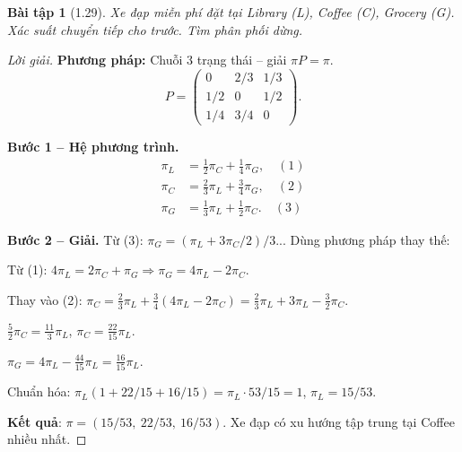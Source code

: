 \documentclass[8pt,a4paper]{article}
\newtheorem{exercise}{Bài tập}
\newenvironment{solution}{\begin{proof}[Lời giải]}{\end{proof}}
\begin{document}
\begin{exercise}[1.29]
Xe đạp miễn phí đặt tại Library (L), Coffee (C), Grocery (G). Xác suất chuyển tiếp cho trước. Tìm phân phối dừng.
\end{exercise}
\begin{solution}
\textbf{Phương pháp:} Chuỗi 3 trạng thái -- giải $\pi P = \pi$.
\[
  P = \begin{pmatrix} 0 & 2/3 & 1/3 \\ 1/2 & 0 & 1/2 \\ 1/4 & 3/4 & 0 \end{pmatrix}.
\]

\textbf{Bước 1 -- Hệ phương trình.}
\begin{align*}
  \pi_L &= \tfrac{1}{2}\pi_C + \tfrac{1}{4}\pi_G, \quad (1) \\
  \pi_C &= \tfrac{2}{3}\pi_L + \tfrac{3}{4}\pi_G, \quad (2) \\
  \pi_G &= \tfrac{1}{3}\pi_L + \tfrac{1}{2}\pi_C. \quad (3)
\end{align*}

\textbf{Bước 2 -- Giải.}
Từ (3): $\pi_G = (\pi_L + 3\pi_C/2)/3$... Dùng phương pháp thay thế:

Từ (1): $4\pi_L = 2\pi_C + \pi_G \Rightarrow \pi_G = 4\pi_L - 2\pi_C$.

Thay vào (2): $\pi_C = \frac{2}{3}\pi_L + \frac{3}{4}(4\pi_L - 2\pi_C) = \frac{2}{3}\pi_L + 3\pi_L - \frac{3}{2}\pi_C$.

$\frac{5}{2}\pi_C = \frac{11}{3}\pi_L$, $\pi_C = \frac{22}{15}\pi_L$.

$\pi_G = 4\pi_L - \frac{44}{15}\pi_L = \frac{16}{15}\pi_L$.

Chuẩn hóa: $\pi_L(1 + 22/15 + 16/15) = \pi_L \cdot 53/15 = 1$, $\pi_L = 15/53$.

\textbf{Kết quả}: $\pi = (15/53,\ 22/53,\ 16/53)$. Xe đạp có xu hướng tập trung tại Coffee nhiều nhất.
\end{solution}
\end{document}
